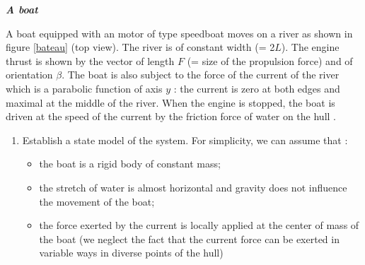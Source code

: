 \begin{exercice}{\bf \em A boat}

A boat equipped with an  motor of type \og speedboat \gf moves on a river as shown in figure \ref{bateau} (top view). The river is of constant width (= 2$L$). The engine thrust is shown by the vector of length $F$ (= size of the propulsion force) and of orientation $\beta$. The boat is also subject to the force of the current of the river which is a parabolic function of axis $y$ : the current is zero at both edges and maximal at the middle of the river. When the engine is stopped, the boat is driven at the speed of the current by the friction force of water on the hull .
\begin{enumerate}
\item Establish a state model of the system. For simplicity, we can assume that : 
\begin{itemize}
\item[a)] the boat is a rigid body of constant mass;
\item[b)] the stretch of water is almost horizontal and gravity does not influence the movement of the boat;
\item[c)] the force exerted by the current is locally applied at the center of mass of the boat (we neglect the fact that the current force can be exerted in variable ways in diverse points of the hull)

\end{itemize}
\end{enumerate}
\end{exercice}
